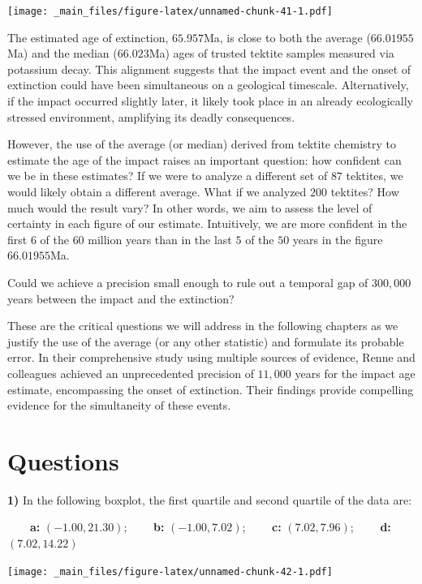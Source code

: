 \documentclass[
]{book}
\begin{document}
\texttt{[image: \_main\_files/figure-latex/unnamed-chunk-41-1.pdf]}

The estimated age of extinction, \(65.957\)Ma, is close to both the average (\(66.01955\)Ma) and the median (\(66.023\)Ma) ages of trusted tektite samples measured via potassium decay. This alignment suggests that the impact event and the onset of extinction could have been simultaneous on a geological timescale. Alternatively, if the impact occurred slightly later, it likely took place in an already ecologically stressed environment, amplifying its deadly consequences.

However, the use of the average (or median) derived from tektite chemistry to estimate the age of the impact raises an important question: how confident can we be in these estimates? If we were to analyze a different set of \(87\) tektites, we would likely obtain a different average. What if we analyzed \(200\) tektites? How much would the result vary? In other words, we aim to assess the level of certainty in each figure of our estimate. Intuitively, we are more confident in the first \(6\) of the \(60\) million years than in the last \(5\) of the \(50\) years in the figure \(66.01955\)Ma.

Could we achieve a precision small enough to rule out a temporal gap of \(300,000\) years between the impact and the extinction?

These are the critical questions we will address in the following chapters as we justify the use of the average (or any other statistic) and formulate its probable error. In their comprehensive study using multiple sources of evidence, Renne and colleagues achieved an unprecedented precision of \(11,000\) years for the impact age estimate, encompassing the onset of extinction. Their findings provide compelling evidence for the simultaneity of these events.

\hypertarget{questions}{%
\section{Questions}\label{questions}}

\textbf{1)} In the following boxplot, the first quartile and second quartile of the data are:

\textbf{\(\qquad\)a:} \((-1.00, 21.30)\); \textbf{\(\qquad\)b:} \((-1.00, 7.02)\); \textbf{\(\qquad\)c:} \((7.02, 7.96)\); \textbf{\(\qquad\)d:} \((7.02, 14.22)\)

\texttt{[image: \_main\_files/figure-latex/unnamed-chunk-42-1.pdf]}
\end{document}
